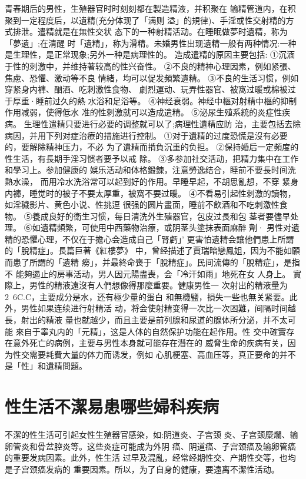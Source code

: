 \documentclass[12pt,UTF8]{ctexbook}
\begin{document}
青春期后的男性，生殖器官时时刻刻都在製造精液，并积聚在
输精管道内，在积聚到一定程度后，以遺精(充分体现了「满则
溢」的規律)、手淫或性交射精的方式排泄。遣精就是在無性交状
态下的一种射精活动。在睡眠做夢时遺精，称为「夢遺」;在清醒
时「遺精」，称为滑精。未婚男性出现遺精一般有两种情况:一种
是生理性，是正常现象;另外一种是病理性的。
造成遣精的原因主要包括:
①沉湎于性的刺激中，并维持著较高的性兴奋性。
②不良的精神心理因素，例如紧張、焦慮、恐懼、激动等不良
情緒，均可以促发頻繁遺精。
③不良的生活习惯，例如穿紧身内褲、酗酒、吃刺激性食物、
劇烈運动、玩弄性器官、被窩过暖或棉被过于厚重·睡前过久的熱
水浴和足浴等。
④神经衰弱。神经中樞对射精中樞的抑制作用减弱，使得低水
准的性刺激就可以造成遣精。
⑤泌尿生殖系統的炎症性疾病。
生理性遣精只要进行必要的调整就可以了;病理性遺精应防
治，主要包括去除病因，并用下列对症治療的措施进行控制。
①对于遺精的过度恐慌是沒有必要的，要解除精神压力，不必
为了遺精而掯負沉重的负担。
②保持婚后一定頻度的性生活，有長期手淫习惯者要予以戒
除。
③多参加社交活动，把精力集中在工作和學习上。参加健康的
娛乐活动和体格鍛鍊，注意勞逸结合，睡前不要長时间洗熱水澡，
而用冷水洗浴常可以起到好的作用。早睡早起，不胡思亂想，不穿
紧身内褲，睡觉时的被子不要太厚重，被窩不要过暖。
④不看易引起性刺激的讀物，如淫穢影片、黄色小说、性挑逗
很强的圆片畫面，睡前不飲酒和不吃刺激性食物。
⑤養成良好的衛生习惯，每日清洗外生殖器官，包皮过長和包
茎者要儘早处理。
⑥如遺精頻繁，可使用中西藥物治療，或阴茎头塗抹表面麻醉
劑·
男性对遺精的恐懼心理，不仅在于擔心会造成自己「腎虧」’
更害怕遺精会讓他們患上所謂的「脫精症」。長篇巨著《紅樓夢》
中，曾经描述了賈瑞暗戀鳳姐，因为不能如願而患了所謂的「遺精
癆」，并最終命喪于「脫精症」。民间流傳的「脫精症」，是指不
能夠遏止的房事活动，男人因元陽盡喪，会「冷汗如雨」地死在女
人身上。
實際上，男性的精液遠沒有人們想像得那麼重要。健康男性一
次射出的精液量为2~6C.C，主要成分是水，还有極少量的蛋白
和無機鹽，損失一些也無关紧要。此外，男性如果连续进行射精活
动，将会使射精变得一次比一次困難，间隔时间越長，射出的精液
量也就越少，而且主要是前列腺和尿道的腺体所分泌，并不太可能
來自于睾丸内的「元精」，这是人体的自然保护功能在起作用。性
交中確實存在意外死亡的病例，主要与男性本身就可能存在潛在的
威脅生命的疾病有关，因为性交需要耗費大量的体力而诱发，例如
心肌梗塞、高血压等，真正要命的并不是「性」和遺精問題。

\section{性生活不潔易患哪些婦科疾病}

不潔的性生活可引起女性生殖器官感染，如:阴道炎、子宫颈
炎、子宫颈糜爛、输卵管炎和骨盆腔炎等。这些炎症可能成为外阴
癌、阴道癌、子宫颈癌及输卵管癌的重要发病因素。此外，性生活
过早及混亂，经常经期性交、产期性交等，也均是子宫颈癌发病的
重要因素。所以，为了自身的健康，要遠离不潔性活动。
\end{document}
